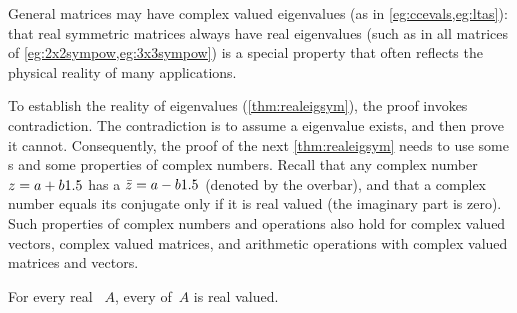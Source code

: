 
General matrices may have complex valued eigenvalues (as in 
\cref{eg:ccevals,eg:ltas}): that real symmetric matrices always have 
real eigenvalues (such as in all matrices of \cref{eg:2x2sympow,eg:3x3sympow}) is a special property that often reflects the physical reality of many applications.

To establish the reality of eigenvalues (\autoref{thm:realeigsym}), the proof invokes contradiction. 
The contradiction is to assume a  eigenvalue exists, and then prove it cannot.
Consequently, the proof of the next \autoref{thm:realeigsym} needs to use some s and some properties of complex numbers.
Recall that any complex number \(z=a+b1.5\) has a  \(\bar z=a-b1.5\) (denoted by the overbar), and that a complex number equals its conjugate only if it is real valued (the imaginary part is zero).
Such properties of complex numbers and operations also hold for complex valued vectors, complex valued matrices, and arithmetic operations with complex valued matrices and vectors.


\begin{comment}
Have not yet thought of reasonable Activities for this subsection.
\end{comment}




\begin{theorem} \label{thm:realeigsym} 
For every real ~\(A\), every  of~\(A\) is real valued.
\end{theorem}


